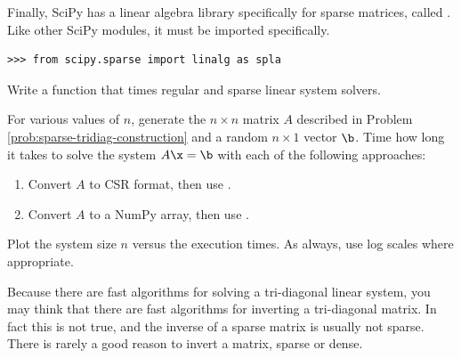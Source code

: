 Finally, SciPy has a linear algebra library specifically for sparse matrices, called .
Like other SciPy modules, it must be imported specifically.

\begin{lstlisting}
>>> from scipy.sparse import linalg as spla
\end{lstlisting}


\begin{problem} %
Write a function that times regular and sparse linear system solvers.

For various values of $n$, generate the $n \times n$ matrix $A$ described in Problem \ref{prob:sparse-tridiag-construction} and a random $n\times 1$ vector $\b$.
Time how long it takes to solve the system $A\x = \b$ with each of the following approaches:
%
\begin{enumerate}
\item Convert $A$ to CSR format, then use .
\item Convert $A$ to a NumPy array, then use .
\end{enumerate}

Plot the system size $n$ versus the execution times.
As always, use log scales where appropriate.
\end{problem}

\begin{warn} %
Because there are fast algorithms for solving a tri-diagonal linear system, you may think that there are fast algorithms for inverting a tri-diagonal matrix.
In fact this is not true, and the inverse of a sparse matrix is usually not sparse.
There is rarely a good reason to invert a matrix, sparse or dense.
\end{warn}

